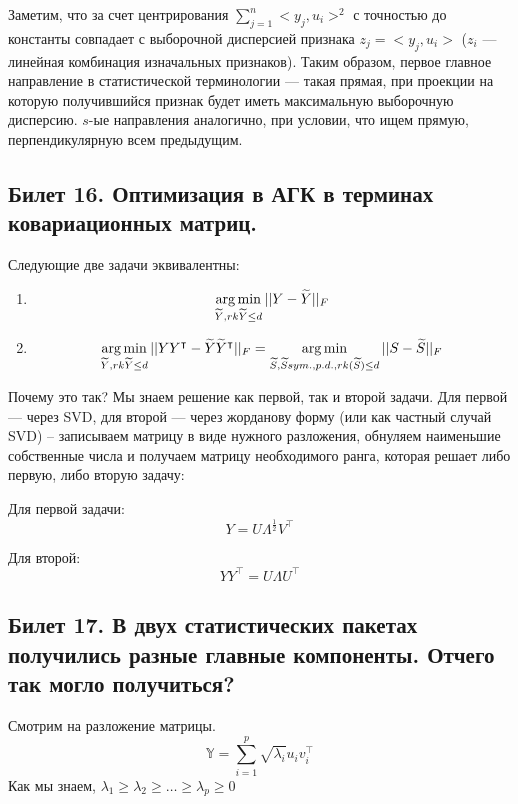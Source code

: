 Заметим, что за счет центрирования $\sum \limits_{j=1}^n <y_j, u_i>^2$ с точностью до константы совпадает с выборочной дисперсией признака $z_j = <y_j, u_i>$ ($z_i$ — линейная комбинация изначальных признаков). Таким образом, 
первое главное направление в статистической терминологии — такая прямая, при проекции на которую получившийся признак будет иметь максимальную выборочную дисперсию. 
$s$-ые направления аналогично, при условии, что ищем прямую, перпендикулярную всем предыдущим.

\subsection{Билет 16. Оптимизация в АГК в терминах ковариационных матриц.}

\begin{thm}
Следующие две задачи эквивалентны:
\begin{enumerate}
\item
$$  \operatorname*{arg\,min}\limits_{\widetilde{Y}, rk\widetilde{Y} \leq d} ||Y - \widetilde{Y}||_{F} $$
\item $$\operatorname*{arg\,min}\limits_{\widetilde{Y}, rk\widetilde{Y} \leq d} ||YY^{\intercal} - \widetilde{Y}\widetilde{Y}^{\intercal}||_{F} = \operatorname*{arg\,min}\limits_{\widetilde{S}, \widetilde{S} sym.,p.d., rk(\widetilde{S}) \leq d} ||S - \widetilde{S}||_{F}$$
\end{enumerate}
\end{thm}

Почему это так? Мы знаем решение как первой, так и второй задачи. Для первой — через SVD, для второй — через жорданову форму (или как частный случай SVD) – записываем матрицу в виде нужного разложения, обнуляем наименьшие собственные числа и получаем матрицу необходимого ранга, которая решает либо первую, либо вторую задачу:

Для первой задачи:
$$ Y = U\Lambda^{\frac{1}{2}} V^{\intercal}$$

Для второй:
$$ YY^{\intercal} = U\Lambda U^{\intercal}$$



\subsection{Билет 17. В двух статистических пакетах получились разные главные компоненты. Отчего так могло
получиться?}
Смотрим на разложение матрицы. 
$$ \mathbb{Y} = \sum \limits_{i=1}^{p} \sqrt{\lambda_i}u_iv_i^{\intercal}$$
Как мы знаем, $\lambda_1 \geq \lambda_2\geq…\geq \lambda_p\geq0$

